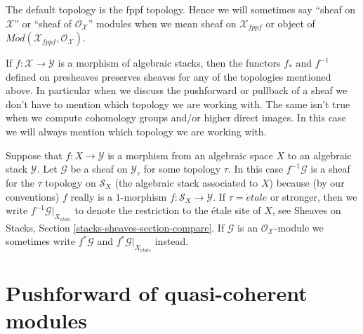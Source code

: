 \medskip\noindent
The default topology is the fppf topology. Hence we will sometimes
say ``sheaf on $\mathcal{X}$'' or ``sheaf of $\mathcal{O}_\mathcal{X}$''
modules when we mean sheaf on $\mathcal{X}_{fppf}$ or object of
$\textit{Mod}(\mathcal{X}_{fppf}, \mathcal{O}_\mathcal{X})$.

\medskip\noindent
If $f : \mathcal{X} \to \mathcal{Y}$ is a morphism of algebraic
stacks, then the functors $f_*$ and $f^{-1}$ defined on presheaves
preserves sheaves for any of the topologies mentioned above. In particular
when we discuss the pushforward or pullback of a sheaf we don't have to
mention which topology we are working with. The same isn't true
when we compute cohomology groups and/or higher direct images. In this
case we will always mention which topology we are working with.

\medskip\noindent
Suppose that $f : X \to \mathcal{Y}$ is a morphism from an algebraic
space $X$ to an algebraic stack $\mathcal{Y}$. Let $\mathcal{G}$ be
a sheaf on $\mathcal{Y}_\tau$ for some topology $\tau$. In this case
$f^{-1}\mathcal{G}$ is a sheaf for the $\tau$ topology on $\mathcal{S}_X$
(the algebraic stack associated to $X$) because (by our conventions) $f$
really is a $1$-morphism $f : \mathcal{S}_X \to \mathcal{Y}$.
If $\tau = \acute{e}tale$ or stronger, then we write
$f^{-1}\mathcal{G}|_{X_{\acute{e}tale}}$
to denote the restriction to the \'etale site of $X$, see
Sheaves on Stacks, Section \ref{stacks-sheaves-section-compare}.
If $\mathcal{G}$ is an $\mathcal{O}_\mathcal{X}$-module we sometimes
write $f^*\mathcal{G}$ and $f^*\mathcal{G}|_{X_{\acute{e}tale}}$
instead.







\section{Pushforward of quasi-coherent modules}
\label{section-pushforward-quasi-coherent}


